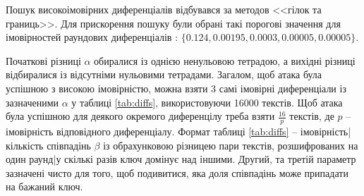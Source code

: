 \documentclass[12pt,a4paper]{article}
\begin{document}
Пошук високоімовірних диференціалів відбувався за методов <<гілок та границь>>. 
Для прискорення пошуку були обрані такі порогові значення для імовірностей раундових диференціалів : $\{ 0.124, 0.00195, 0.0003, 0.00005, 0.00005 \}$.\par
Початкові різниці $\alpha$ обиралися із однією ненульовою тетрадою, а вихідні різниці відбиралися із відсутніми нульовими тетрадами. Загалом, щоб атака була успішною з високою імовірністю, можна взяти 3 самі імовірні диференціали із зазначеними $\alpha$ у таблиці \ref{tab:diffs}, використовуючи 16000 текстів. Щоб атака була успішною для деякого окремого диференцілу треба взяти $\frac{16}{p}$ текстів, де $p$ -- імовірність відповідного диференціалу.
Формат таблиці \ref{tab:diffs} -- {імовірність|кількість співпадінь $\beta$ із обрахунковою різницею пари текстів, розшифрованих на один раунд|у скількі разів ключ домінує над іншими}. Другий, та третій параметр зазначені чисто для того, щоб подивитися, яка доля співпадінь може припадати на бажаний ключ.
\end{document}
